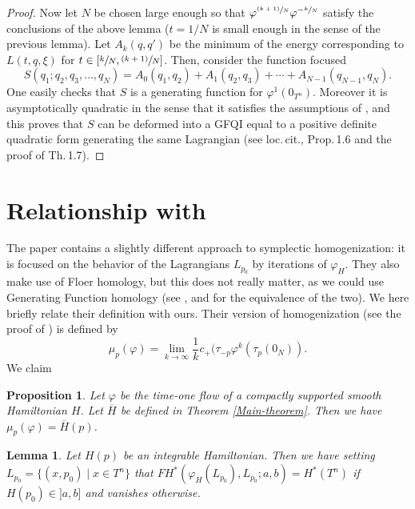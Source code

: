 \documentclass[JEP,XML,SOM,NoFloatCountersInSection,Unicode,published]{cedram}
\newcommand{\psfrac}[2]{\sfrac{(#1)}{#2}}
\numberwithin{equation}{section}
\newcommand{\GFQI}{\textup{GFQI}\xspace}
\theoremstyle{plain}
\newtheorem{lemma}[theorem]{Lemma}
\newtheorem{proposition}[theorem]{Proposition}
\theoremstyle{definition}
\theoremstyle{remark}
\begin{document}
\begin{proof}
Now let $N$ be chosen large enough so that $\varphi^{\psfrac{k+1}{N} }\varphi^{- \sfrac{k}{N} }$ satisfy the conclusions of the above lemma (\ie $t=1/N$ is small enough in the sense of the previous lemma). Let $A_{k}(q,q')$ be the minimum of the energy corresponding to $L(t,q,\xi)$ for $t \in [ \sfrac{k}{N}, \psfrac{k+1}{N}]$. Then, consider the
function
focused
\[
S(q_{1};q_{2},q_{3},\dots,q_{N})=A_{0}(q_{1},q_{2})+A_{1}(q_{2},q_{3})+\cdots+A_{N-1}(q_{N-1},q_{N}).
\]
One easily checks that $S$ is a generating function for $\varphi^{1}(0_{T^{n}})$. Moreover it is asymptotically quadratic in the sense that it satisfies the assumptions of \cite[Prop.\,1.6 p.\,441]{Viterbo-Montreal}, and this proves that $S$ can be deformed into a \GFQI equal to a positive definite quadratic form generating the same Lagrangian (see loc.\,cit., Prop.\,1.6 and the proof of Th.\,1.7).
\end{proof}

\section{Relationship with \texorpdfstring{\cite{M-V-Z}}{MVZ}}
The paper \cite{M-V-Z} contains a slightly different approach to symplectic homogenization: it is focused on the behavior of the Lagrangians $L_{p_0}$ by iterations of $\varphi_H$. They also make use of Floer homology, but this does not really matter, as we could use Generating Function homology (see \cite{Traynor}, and \cite{Viterbo-HJ} for the equivalence of the two). We here briefly relate their definition with ours.
Their version of homogenization (see the proof of \cite[Th.\,1.3]{M-V-Z}) is defined by
\[
\mu_p(\varphi)=\lim_{k\to \infty} \frac{1}{k} c_+(\tau_{-p}\varphi^k (\tau_{p}(0_N)).
\]
We claim
\begin{proposition}\label{Prop-Appendix-E}
Let $\varphi$ be the time-one flow of a compactly supported smooth Hamiltonian $H$. Let $\overline H$ be defined in Theorem \ref{Main-theorem}. Then we have $\mu_p(\varphi)=\overline H(p)$.
\end{proposition}

\begin{lemma}
Let $H(p)$ be an integrable Hamiltonian. Then we have setting $L_{p_0}=\{(x,p_0) \mid x \in T^n\}$ that $FH^*(\varphi_H(L_{p_0}),L_{p_0};a,b)= H^*(T^n)$ if $H(p_0)\in{} ]a,b]$ and vanishes otherwise.
\end{lemma}
\end{document}
